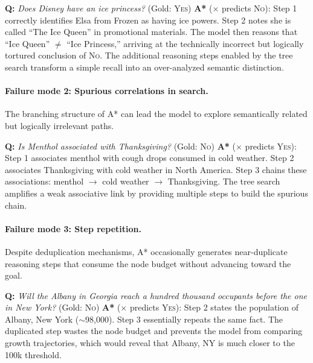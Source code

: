 \documentclass[11pt]{article}
\begin{document}
\begin{examplebox}[title=StrategyQA --- Overthinking]
\textbf{Q:} \emph{Does Disney have an ice princess?} \quad (Gold: \textsc{Yes})
\tcblower
\textbf{A*} ($\times$ predicts \textsc{No}): Step 1 correctly identifies Elsa from Frozen as having ice powers. Step 2 notes she is called ``The Ice Queen'' in promotional materials. The model then reasons that ``Ice Queen'' $\neq$ ``Ice Princess,'' arriving at the technically incorrect but logically tortured conclusion of \textsc{No}. The additional reasoning steps enabled by the tree search transform a simple recall into an over-analyzed semantic distinction.
\end{examplebox}

\paragraph{Failure mode 2: Spurious correlations in search.} The branching structure of A* can lead the model to explore semantically related but logically irrelevant paths.

\begin{examplebox}[title=StrategyQA --- Spurious Correlation]
\textbf{Q:} \emph{Is Menthol associated with Thanksgiving?} \quad (Gold: \textsc{No})
\tcblower
\textbf{A*} ($\times$ predicts \textsc{Yes}): Step 1 associates menthol with cough drops consumed in cold weather. Step 2 associates Thanksgiving with cold weather in North America. Step 3 chains these associations: menthol $\to$ cold weather $\to$ Thanksgiving. The tree search amplifies a weak associative link by providing multiple steps to build the spurious chain.
\end{examplebox}

\paragraph{Failure mode 3: Step repetition.} Despite deduplication mechanisms, A* occasionally generates near-duplicate reasoning steps that consume the node budget without advancing toward the goal.

\begin{examplebox}[title=StrategyQA --- Step Repetition]
\textbf{Q:} \emph{Will the Albany in Georgia reach a hundred thousand occupants before the one in New York?} \quad (Gold: \textsc{No})
\tcblower
\textbf{A*} ($\times$ predicts \textsc{Yes}): Step 2 states the population of Albany, New York ($\sim$98{,}000). Step 3 essentially repeats the same fact. The duplicated step wastes the node budget and prevents the model from comparing growth trajectories, which would reveal that Albany, NY is much closer to the 100k threshold.
\end{examplebox}
\end{document}
